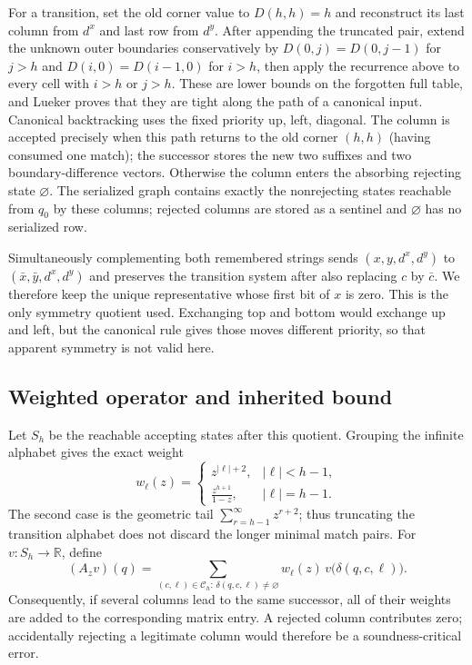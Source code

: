 \documentclass[11pt]{article}
\theoremstyle{plain}
\begin{document}
For a transition, set the old corner value to $D(h,h)=h$ and reconstruct its last column from $d^x$ and last row from $d^y$. After appending the truncated pair, extend the unknown outer boundaries conservatively by $D(0,j)=D(0,j-1)$ for $j>h$ and $D(i,0)=D(i-1,0)$ for $i>h$, then apply the recurrence above to every cell with $i>h$ or $j>h$. These are lower bounds on the forgotten full table, and Lueker proves that they are tight along the path of a canonical input. Canonical backtracking uses the fixed priority up, left, diagonal. The column is accepted precisely when this path returns to the old corner $(h,h)$ (having consumed one match); the successor stores the new two suffixes and two boundary-difference vectors. Otherwise the column enters the absorbing rejecting state $\varnothing$. The serialized graph contains exactly the nonrejecting states reachable from $q_0$ by these columns; rejected columns are stored as a sentinel and $\varnothing$ has no serialized row.

Simultaneously complementing both remembered strings sends $(x,y,d^x,d^y)$ to $(\bar x,\bar y,d^x,d^y)$ and preserves the transition system after also replacing $c$ by $\bar c$. We therefore keep the unique representative whose first bit of $x$ is zero. This is the only symmetry quotient used. Exchanging top and bottom would exchange up and left, but the canonical rule gives those moves different priority, so that apparent symmetry is not valid here.

\subsection{Weighted operator and inherited bound}

Let $S_h$ be the reachable accepting states after this quotient. Grouping the infinite alphabet gives the exact weight
\[
 w_\ell(z)=
 \begin{cases}
   z^{|\ell|+2},&|\ell|<h-1,\\[2pt]
   \displaystyle\frac{z^{h+1}}{1-z},&|\ell|=h-1.
 \end{cases}
\]
The second case is the geometric tail $\sum_{r=h-1}^{\infty}z^{r+2}$; thus truncating the transition alphabet does not discard the longer minimal match pairs. For $v:S_h\to\mathbb R$, define
\[
 (A_zv)(q)=
 \sum_{(c,\ell)\in\mathcal C_h:\,\delta(q,c,\ell)\ne\varnothing}
 w_\ell(z)\,v\bigl(\delta(q,c,\ell)\bigr).
\]
Consequently, if several columns lead to the same successor, all of their weights are added to the corresponding matrix entry. A rejected column contributes zero; accidentally rejecting a legitimate column would therefore be a soundness-critical error.
\end{document}
